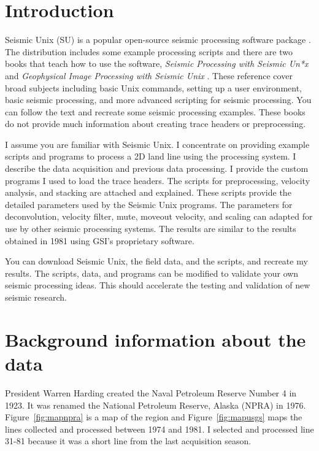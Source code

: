 \section{Introduction}
Seismic Unix (SU) is a popular open-source seismic processing software
package \cite[]{TLE16-07-10451049,cohen}.  The distribution
includes some example processing scripts and there are two books that
teach how to use the software, \emph{Seismic Processing with Seismic
  Un*x} \cite[]{forel} and \emph{Geophysical Image Processing with
  Seismic Unix} \cite[]{stockwell} .  These reference cover broad
subjects including basic Unix commands, setting up a user environment,
basic seismic processing, and more advanced scripting for seismic
processing.  You can follow the text and recreate some seismic
processing examples.  These books do not provide much information
about creating trace headers or preprocessing.\nocite{cohen}

I assume you are familiar with Seismic Unix.  I concentrate
on providing example scripts and programs to process a 2D land line
using the processing system. I describe the data acquisition and
previous data processing.  I provide the custom programs I used to
load the trace headers.  The scripts for preprocessing, velocity
analysis, and stacking are attached and explained.  These scripts
provide the detailed parameters used by the Seismic Unix programs.
The parameters for deconvolution, velocity filter, mute, moveout
velocity, and scaling can adapted for use by other seismic processing
systems. The results are similar to the results obtained in 1981 using
GSI's proprietary software.  

You can download Seismic Unix, the field data, and the scripts, and 
recreate my results.  The scripts, data, and programs can be modified 
to validate your own seismic processing ideas.  This should accelerate 
the testing and validation of new seismic research.

\section{Background information about the data}

President Warren Harding created the Naval Petroleum Reserve Number 4
in 1923.  It was renamed the National Petroleum Reserve, Alaska (NPRA)
in 1976.  Figure~\ref{fig:mapnpra} is a map of the region and 
Figure~\ref{fig:mapusgs} maps the lines collected and processed between 1974
and 1981.  I selected and processed line 31-81 because it was a short
line from the last acquisition season.

